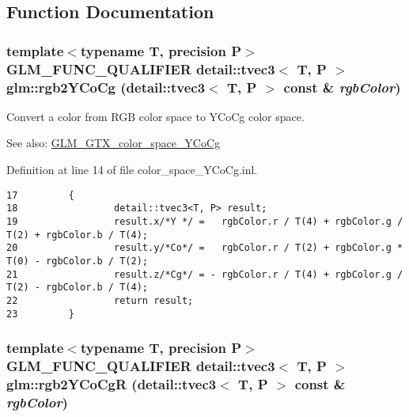 \subsection{Function Documentation}
\hypertarget{group__gtx__color__space___y_co_cg_gfd5ca4a311e055d522c031650e528b02}{
\subsubsection[rgb2YCoCg]{\setlength{\rightskip}{0pt plus 5cm}template$<$typename T, precision P$>$ GLM\_\-FUNC\_\-QUALIFIER detail::tvec3$<$ T, P $>$ glm::rgb2YCoCg (detail::tvec3$<$ T, P $>$ const \& {\em rgbColor})}}
\label{group__gtx__color__space___y_co_cg_gfd5ca4a311e055d522c031650e528b02}


Convert a color from RGB color space to YCoCg color space. \begin{Desc}
\item[See also:]\hyperlink{group__gtx__color__space___y_co_cg}{GLM\_\-GTX\_\-color\_\-space\_\-YCoCg} \end{Desc}


Definition at line 14 of file color\_\-space\_\-YCoCg.inl.

\begin{Code}\begin{verbatim}17         {
18                 detail::tvec3<T, P> result;
19                 result.x/*Y */ =   rgbColor.r / T(4) + rgbColor.g / T(2) + rgbColor.b / T(4);
20                 result.y/*Co*/ =   rgbColor.r / T(2) + rgbColor.g * T(0) - rgbColor.b / T(2);
21                 result.z/*Cg*/ = - rgbColor.r / T(4) + rgbColor.g / T(2) - rgbColor.b / T(4);
22                 return result;
23         }
\end{verbatim}
\end{Code}


\hypertarget{group__gtx__color__space___y_co_cg_gda2dcb113c669093c7099dc58f26fb7c}{
\subsubsection[rgb2YCoCgR]{\setlength{\rightskip}{0pt plus 5cm}template$<$typename T, precision P$>$ GLM\_\-FUNC\_\-QUALIFIER detail::tvec3$<$ T, P $>$ glm::rgb2YCoCgR (detail::tvec3$<$ T, P $>$ const \& {\em rgbColor})}}
\label{group__gtx__color__space___y_co_cg_gda2dcb113c669093c7099dc58f26fb7c}


